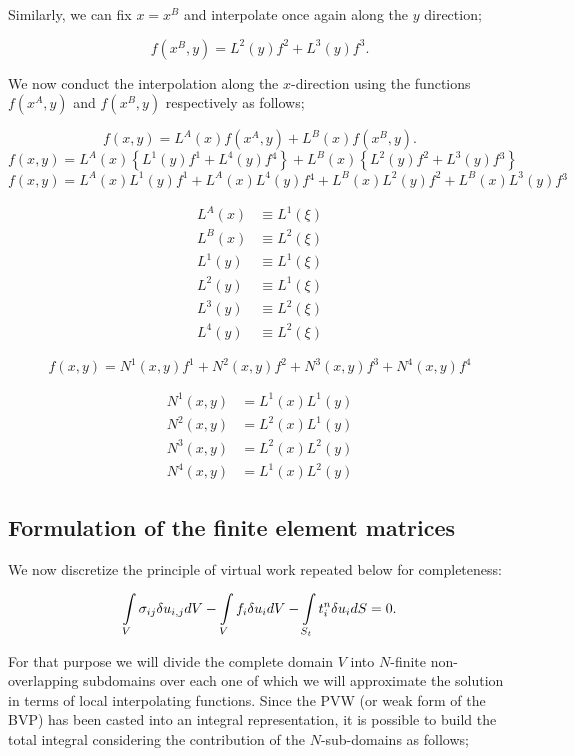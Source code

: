 Similarly, we can fix $x = {x^B}$ and interpolate once again along the $y$ direction;

\[f({x^B},y) = {L^2}(y){f^2} + {L^3}(y){f^3}.\]

We now conduct the interpolation along the $x$-direction using the functions $f({x^A},y)$ and $f({x^B},y)$ respectively as follows;

\[f(x,y) = {L^A}(x){f({x^A},y)} + {L^B}(x){f({x^B},y)}.\]
\[f(x,y) = {L^A}(x)\left\{ {{L^1}(y){f^1} + {L^4}(y)f{}^4} \right\} + {L^B}(x)\left\{ {{L^2}(y){f^2} + {L^3}(y)f{}^3} \right\}\]
\[f(x,y) = {L^A}(x){L^1}(y){f^1} + {L^A}(x){L^4}(y)f{}^4 + {L^B}(x){L^2}(y){f^2} + {L^B}(x){L^3}(y)f{}^3\]


\begin{align*}
{L^A}(x) & \equiv {L^1}(\xi ) \\
{L^B}(x) & \equiv {L^2}(\xi ) \\
{L^1}(y) & \equiv {L^1}(\xi ) \\
{L^2}(y) & \equiv {L^1}(\xi ) \\
{L^3}(y) & \equiv {L^2}(\xi ) \\
{L^4}(y) & \equiv {L^2}(\xi )
\end{align*}

\[f(x,y) = {N^1}(x,y){f^1} + {N^2}(x,y){f^2} + {N^3}(x,y){f^3} + {N^4}(x,y){f^4}\]

\begin{align*}
{N^1}(x,y) & = {L^1}(x){L^1}(y) \\
{N^2}(x,y) & = {L^2}(x){L^1}(y) \\
{N^3}(x,y) & = {L^2}(x){L^2}(y) \\
{N^4}(x,y) & = {L^1}(x){L^2}(y)
\end{align*}


\subsection{Formulation of the finite element matrices}
We now discretize the principle of virtual work repeated below for completeness:

\begin{equation} \label{pvw_2}
\int\limits_V \sigma_{ij} \delta u_{i,j} dV - \int\limits_V f_i \delta u_i dV - \int\limits_{S_t} t_i^n \delta u_i dS = 0.
\end{equation}

For that purpose we will divide the complete domain $V$ into $N$-finite non-overlapping subdomains over each one of which we will approximate the solution in terms of local interpolating functions. Since the PVW (or weak form of the BVP) has been casted into an integral representation, it is possible to build the total integral considering the contribution of the $N$-sub-domains as follows;

